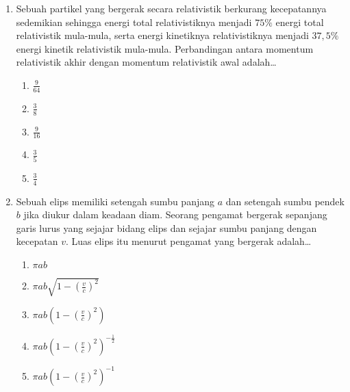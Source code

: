 \documentclass[A4,12PT, english, twocolumn]{journal}
\begin{document}
\begin{enumerate}
\item Sebuah partikel yang bergerak secara relativistik berkurang kecepatannya sedemikian sehingga energi total relativistiknya menjadi $75\%$ energi total relativistik mula-mula, serta energi kinetiknya relativistiknya menjadi $37,5\%$ energi kinetik relativistik mula-mula. Perbandingan antara momentum relativistik akhir dengan momentum relativistik awal adalah\dots
    \begin{enumerate}
        \item $\frac{9}{64}$
        \item $\frac{3}{8}$
        \item $\frac{9}{16}$
        \item $\frac{3}{5}$
        \item $\frac{3}{4}$
    \end{enumerate}

\item Sebuah elips memiliki setengah sumbu panjang $a$ dan setengah sumbu pendek $b$ jika diukur dalam keadaan diam. Seorang pengamat bergerak sepanjang garis lurus yang sejajar bidang elips dan sejajar sumbu panjang dengan kecepatan $v$. Luas elips itu menurut pengamat yang bergerak adalah\dots
    \begin{enumerate}
        \item $\pi a b$
        \item $\pi a b \sqrt{1-\left( \frac{v}{c} \right)^2}$
        \item $\pi a b \left( 1-\left( \frac{v}{c} \right)^2 \right)$
        \item $\pi a b \left( 1-\left( \frac{v}{c} \right)^2 \right)^{-\frac{1}{2}}$
        \item $\pi a b \left( 1-\left( \frac{v}{c} \right)^2 \right)^{-1}$
    \end{enumerate}

\end{enumerate}
\end{document}
